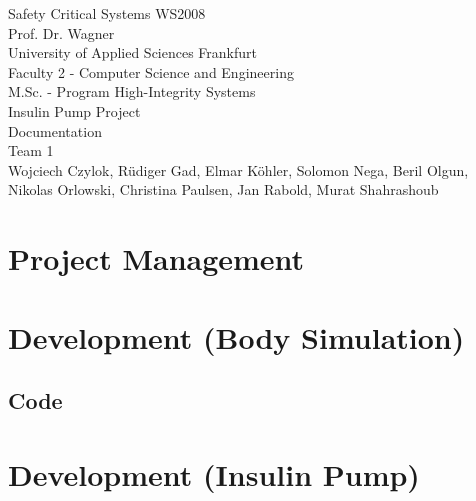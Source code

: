\documentclass[pdflatex,a4paper,11pt,english]{scrreprt}
\begin{document}
\begin{titlepage}
\vspace*{4cm}
\begin{center}
\Large
Safety Critical Systems WS2008\\
Prof. Dr. Wagner\\
\vspace{4cm}
\normalsize
University of Applied Sciences Frankfurt\\
Faculty 2 - Computer Science and Engineering\\
M.Sc. - Program High-Integrity Systems\\
\vspace{2cm}
Insulin Pump Project\\
Documentation\\
Team 1\\
\vspace{2cm}
Wojciech Czylok, Rüdiger Gad, Elmar Köhler, Solomon Nega, Beril Olgun,\\
Nikolas Orlowski, Christina Paulsen, Jan Rabold, Murat Shahrashoub
\end{center}
\end{titlepage}

\tableofcontents

\listoffigures


\newpage
\chapter{Project Management}



\chapter{Development (Body Simulation)}




\newpage


\newpage


\section{Code}

\chapter{Development (Insulin Pump)}




        
\end{document}
